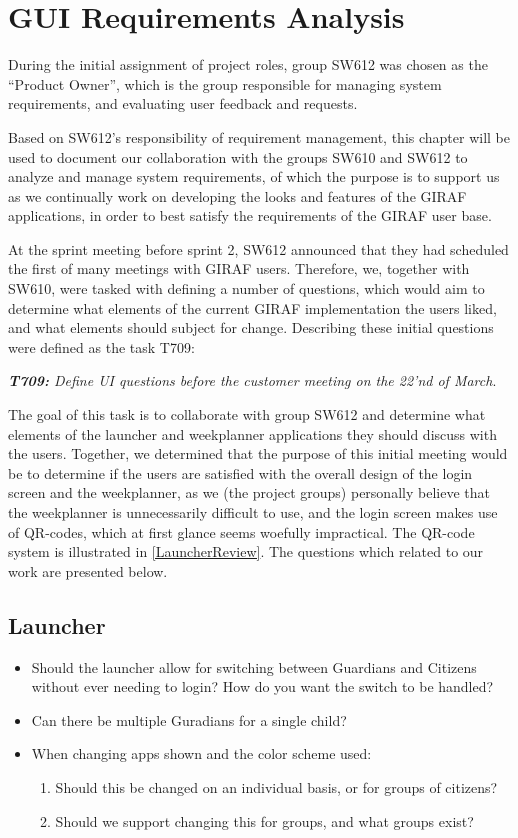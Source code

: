 \chapter{GUI Requirements Analysis}\label{sec:Colab2}
During the initial assignment of project roles, group SW612 was chosen as the
``Product Owner'', which is the group responsible for managing system
requirements, and evaluating user feedback and requests.\nl

Based on SW612's responsibility of requirement management, this chapter will be
used to document our collaboration with the groups SW610 and SW612 to analyze
and manage system requirements, of which the purpose is to support us as we
continually work on developing the looks and features of the GIRAF applications,
in order to best satisfy the requirements of the GIRAF user base.\nl

At the sprint meeting before sprint 2, SW612 announced that they had scheduled
the first of many meetings with GIRAF users. Therefore, we, together with SW610,
were tasked with defining a number of questions, which would aim to determine
what elements of the current GIRAF implementation the users liked, and what
elements should subject for change. Describing these initial questions were 
defined as the task T709:\nl

\textit{\textbf{T709:} Define UI questions before the customer meeting on the
22'nd of March}.\nl 

The goal of this task is to collaborate with group SW612 and determine what
elements of the launcher and weekplanner applications they should discuss with
the users. Together, we determined that the purpose of this initial meeting
would be to determine if the users are satisfied with the overall design of the
login screen and the weekplanner, as we (the project groups) personally believe
that the weekplanner is unnecessarily difficult to use, and the login screen
makes use of QR-codes, which at first glance seems woefully impractical. The
QR-code system is illustrated in \autoref{LauncherReview}. The questions which
related to our work are presented below.

\section*{Launcher}
\begin{itemize}
  \item Should the launcher allow for switching between Guardians and Citizens
  without ever needing to login? How do you want the switch to be handled?
  \item Can there be multiple Guradians for a single child?
  \item When changing apps shown and the color scheme used:
  	\begin{enumerate}
  	\item Should this be changed on an individual basis, or for groups of
  	citizens?
  	\item Should we support changing this for groups, and what groups exist?
	\end{enumerate}
\end{itemize}

